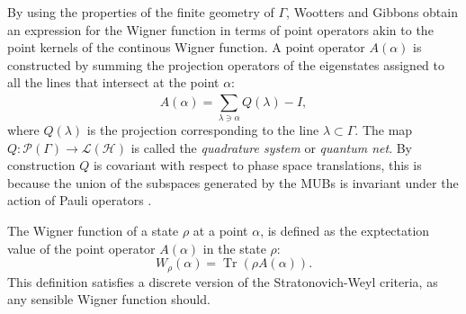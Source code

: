 \documentclass[a4paper, 11pt]{article}
\DeclareMathOperator{\Tr}{Tr}
\begin{document}
  By using the properties of the finite geometry of
  $\Gamma$, Wootters and Gibbons obtain an expression for
  the Wigner function in terms of point operators akin to
  the point kernels of the continous Wigner function. A
  point operator $A(\alpha)$ is constructed by summing the
  projection operators of the eigenstates assigned to all
  the lines that intersect at the point $\alpha$:
  \begin{equation}
    A(\alpha)
    = \sum_{\lambda \ni \alpha}^{} Q(\lambda) - I,
  \end{equation}
  where $Q(\lambda)$ is the projection corresponding to the
  line $\lambda \subset \Gamma$. The map $Q : \mathcal
  P(\Gamma) \to \mathcal L(\mathcal H)$ is called the
  \textit{quadrature system} or \textit{quantum net}. By
  construction $Q$ is covariant with respect to phase space
  translations, this is because the union of the subspaces
  generated by the MUBs is invariant under the action of
  Pauli operators \cite{kantor2012}.

  The Wigner function of a state $\rho$ at a point $\alpha$,
  is defined as the exptectation value of the point operator
  $A(\alpha)$ in the state $\rho$:
  \begin{equation}
    W_\rho(\alpha)
    = \Tr\left( \rho A(\alpha) \right).
  \end{equation}
  This definition satisfies a discrete version of the
  Stratonovich-Weyl criteria, as any sensible Wigner
  function should.
\end{document}
